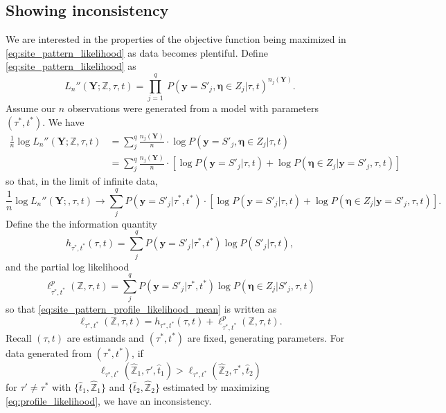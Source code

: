 \documentclass[a4paper]{article}
\newcommand{\fullAlignment}{\mathbf{Y}}
\newcommand{\alignmentColumn}{\mathbf{y}}
\newcommand{\siteSplit}{S'}
\newcommand{\ancestralStateColumn}{\boldsymbol\eta}
\newcommand{\ancestralStateCategory}{Z}
\newcommand{\fullAncestralStateCategories}{\mathbb{Z}}
\newcommand{\nCols}{n}
\newcommand{\nSiteSplits}{q}
\begin{document}
\subsection{Showing inconsistency}

We are interested in the properties of the objective function being maximized in \eqref{eq:site_pattern_likelihood} as data becomes plentiful.
Define \eqref{eq:site_pattern_likelihood} as
$$
L_\nCols''(\fullAlignment;\fullAncestralStateCategories,\tau,t) = \prod_{j=1}^{\nSiteSplits} \ P(\alignmentColumn=\siteSplit_j, \ancestralStateColumn\in\ancestralStateCategory_j | \tau, t)^{\nCols_j(\fullAlignment)} .
$$
Assume our $\nCols$ observations were generated from a model with parameters $(\tau^*, t^*)$.
We have
\begin{align}
    \frac{1}{\nCols} \log L_\nCols''(\fullAlignment;\fullAncestralStateCategories,\tau,t)
        &= \sum_{j}^\nSiteSplits \frac{\nCols_j(\fullAlignment)}{\nCols}\cdot  \log P(\alignmentColumn=\siteSplit_j, \ancestralStateColumn\in\ancestralStateCategory_j | \tau, t) \\
        &= \sum_{j}^\nSiteSplits \frac{\nCols_j(\fullAlignment)}{\nCols}\cdot [\log P(\alignmentColumn=\siteSplit_j | \tau, t) +
            \log P(\ancestralStateColumn\in\ancestralStateCategory_j | \alignmentColumn=\siteSplit_j , \tau, t)]
\end{align}
so that, in the limit of infinite data,
\begin{equation}
\frac{1}{\nCols} \log L_\nCols''(\fullAlignment;,\tau,t) \rightarrow \sum_{j}^\nSiteSplits P(\alignmentColumn=\siteSplit_j | \tau^*, t^*) \cdot [\log P(\alignmentColumn=\siteSplit_j | \tau, t) + \log P(\ancestralStateColumn\in\ancestralStateCategory_j | \alignmentColumn=\siteSplit_j , \tau, t)]. \label{eq:site_pattern_profile_likelihood_mean}
\end{equation}
Define the the information quantity
$$
h_{\tau^*,t^*}(\tau,t) = \sum_{j}^\nSiteSplits P(\alignmentColumn=\siteSplit_j | \tau^*, t^*) \log P(\siteSplit_j | \tau, t),
$$
and the partial log likelihood
$$
\ell^p_{\tau^*,t^*}(\fullAncestralStateCategories,\tau,t) = \sum_{j}^\nSiteSplits P(\alignmentColumn=\siteSplit_j | \tau^*, t^*) \log P(\ancestralStateColumn\in\ancestralStateCategory_j | \siteSplit_j, \tau, t)
$$
so that \eqref{eq:site_pattern_profile_likelihood_mean} is written as
\begin{equation}
    \label{eq:log_likelihood_simplified}
\ell_{\tau^*,t^*}(\fullAncestralStateCategories,\tau,t) = h_{\tau^*,t^*}(\tau,t) + \ell^p_{\tau^*,t^*}(\fullAncestralStateCategories,\tau,t).
\end{equation}
Recall $(\tau, t)$ are estimands and $(\tau^*, t^*)$ are fixed, generating parameters.
For data generated from $(\tau^*, t^*)$, if
\begin{equation}
\label{eq:inconsistency_inequality}
\ell_{\tau^*,t^*}(\hat{\fullAncestralStateCategories}_1,\tau',\hat{t}_1) > \ell_{\tau^*,t^*}(\hat{\fullAncestralStateCategories}_2,\tau^*,\hat{t}_2)
\end{equation}
for $\tau'\neq\tau^*$ with $\{\hat{t}_1,\hat{\fullAncestralStateCategories}_1\}$ and $\{\hat{t}_2,\hat{\fullAncestralStateCategories}_2\}$ estimated by maximizing \eqref{eq:profile_likelihood}, we have an inconsistency.
\end{document}
